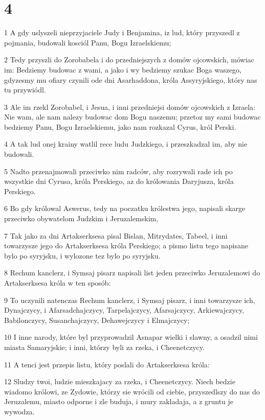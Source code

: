 \chapter{4}

\par 1 A gdy uslyszeli nieprzyjaciele Judy i Benjamina, iz lud, który przyszedl z pojmania, budowali kosciól Panu, Bogu Izraelskiemu;
\par 2 Tedy przyszli do Zorobabela i do przedniejszych z domów ojcowskich, mówiac im: Bedziemy budowac z wami, a jako i wy bedziemy szukac Boga waszego, gdyzesmy mu ofiary czynili ode dni Asarhaddona, króla Assyryjskiego, który nas tu przywiódl.
\par 3 Ale im rzekl Zorobabel, i Jesua, i inni przedniejsi domów ojcowskich z Izraela: Nie wam, ale nam nalezy budowac dom Bogu naszemu; przetoz my sami budowac bedziemy Panu, Bogu Izraelskiemu, jako nam rozkazal Cyrus, król Perski.
\par 4 A tak lud onej krainy watlil rece ludu Judzkiego, i przeszkadzal im, aby nie budowali.
\par 5 Nadto przenajmowali przeciwko nim radców, aby rozrywali rade ich po wszystkie dni Cyrusa, króla Perskiego, az do królowania Daryjusza, króla Perskiego.
\par 6 Bo gdy królowal Aswerus, tedy na poczatku królestwa jego, napisali skarge przeciwko obywatelom Judzkim i Jeruzalemskim,
\par 7 Tak jako za dni Artakserksesa pisal Bislan, Mitrydates, Tabeel, i inni towarzysze jego do Artakserksesa króla Perskiego; a pismo listu tego napisane bylo po syryjsku, i wylozone tez bylo po syryjsku.
\par 8 Rechum kanclerz, i Symsaj pisarz napisali list jeden przeciwko Jeruzalemowi do Artakserksesa króla w ten sposób:
\par 9 To uczynili natenczas Rechum kanclerz, i Symsaj pisarz, i inni towarzysze ich, Dynajczycy, i Afarsadchajczycy, Tarpelajczycy, Afarsajczycy, Arkiewajczycy, Babilonczycy, Susanchajczycy, Dehawejczycy i Elmajczycy;
\par 10 I inne narody, które byl przyprowadzil Asnapar wielki i slawny, a osadzil nimi miasta Samaryjskie; i inni, którzy byli za rzeka, i Cheenetczycy.
\par 11 A tenci jest przepis listu, który poslali do Artakserksesa króla:
\par 12 Sludzy twoi, ludzie mieszkajacy za rzeka, i Cheenetczycy. Niech bedzie wiadomo królowi, ze Zydowie, którzy sie wrócili od ciebie, przyszedlszy do nas do Jeruzalemu, miasto odporne i zle buduja, i mury zakladaja, a z gruntu je wywodza.
